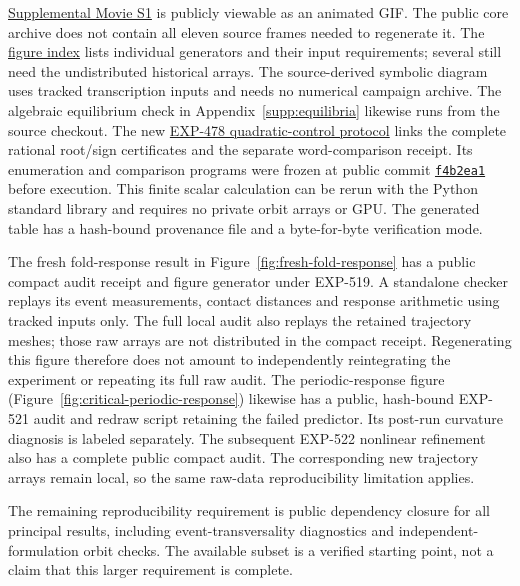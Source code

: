 \href{https://github.com/tdj28/butterfly/blob/research-exp476/paper/supplement/rossler-multib-atlas.gif}{Supplemental Movie S1}
is publicly viewable as an animated GIF. The public core archive does not
contain all eleven source frames needed to regenerate it.
The \href{https://github.com/tdj28/butterfly/tree/main/paper/figures}{figure index}
lists individual generators and their input requirements; several still
need the undistributed historical arrays.
The source-derived symbolic diagram uses tracked transcription inputs and
needs no numerical campaign archive. The algebraic equilibrium check in
Appendix~\ref{supp:equilibria} likewise runs from the source checkout.
The new
\href{https://github.com/tdj28/butterfly/blob/main/docs/experiments/EXP-478-quadratic-symbolic-control.md}{EXP-478 quadratic-control protocol}
links the complete rational root/sign certificates and the separate
word-comparison receipt. Its enumeration and comparison programs were frozen
at public commit
\href{https://github.com/tdj28/butterfly/commit/f4b2ea13c60395713911240b0fbf0ce469850cc4}{\texttt{f4b2ea1}}
before execution. This finite scalar calculation can be rerun with the Python
standard library and requires no private orbit arrays or GPU. The generated
table has a hash-bound provenance file and a byte-for-byte verification mode.

The fresh fold-response result in Figure~\ref{fig:fresh-fold-response} has a
public compact audit receipt and figure generator under EXP-519. A standalone
checker replays its event measurements, contact distances and response
arithmetic using tracked inputs only. The full local audit also replays the
retained trajectory meshes; those raw arrays are not distributed in the
compact receipt. Regenerating this figure therefore does not amount to
independently reintegrating the experiment or repeating its full raw audit.
The periodic-response figure (Figure~\ref{fig:critical-periodic-response})
likewise has a public, hash-bound EXP-521 audit and redraw script retaining
the failed predictor. Its post-run curvature diagnosis is labeled separately.
The subsequent EXP-522 nonlinear refinement also has a complete public compact
audit. The corresponding new trajectory arrays remain local, so the same
raw-data reproducibility limitation applies.

The remaining reproducibility requirement is public dependency closure for
all principal results, including event-transversality diagnostics and
independent-formulation orbit checks. The available subset is a verified
starting point, not a claim that this larger requirement is complete.
